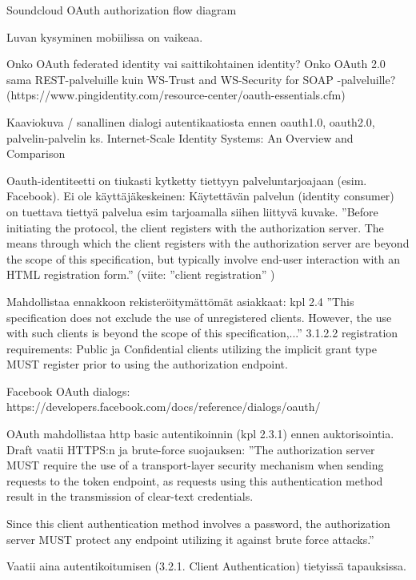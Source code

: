 \documentclass[finnish,gradu]{tktltiki}
\begin{document}
  Soundcloud OAuth authorization flow diagram %


  Luvan kysyminen mobiilissa on vaikeaa.

  Onko OAuth federated identity vai saittikohtainen identity?
  Onko OAuth 2.0 sama REST-palveluille kuin WS-Trust and WS-Security for SOAP -palveluille? (https://www.pingidentity.com/resource-center/oauth-essentials.cfm)

  Kaaviokuva / sanallinen dialogi autentikaatiosta ennen oauth1.0, oauth2.0, palvelin-palvelin
  ks. Internet-Scale Identity Systems: An Overview and Comparison

  Oauth-identiteetti on tiukasti kytketty tiettyyn palveluntarjoajaan (esim. Facebook).
  Ei ole käyttäjäkeskeinen: Käytettävän palvelun (identity consumer) on tuettava tiettyä palvelua esim tarjoamalla siihen liittyvä kuvake.
  ''Before initiating the protocol, the client registers with the authorization server. The means through which the client registers with the authorization
  server are beyond the scope of this specification, but typically involve end-user interaction with an HTML registration form.'' (viite: ''client registration'' \cite{ietf_oauth2})

  Mahdollistaa ennakkoon rekisteröitymättömät asiakkaat: kpl 2.4 ''This specification does not exclude the use of unregistered clients. However, the use with
  such clients is beyond the scope of this specification,...''
  3.1.2.2 registration requirements:
    Public ja Confidential clients utilizing the implicit grant type MUST register prior to using the authorization endpoint.


  Facebook OAuth dialogs: https://developers.facebook.com/docs/reference/dialogs/oauth/

  OAuth mahdollistaa http basic autentikoinnin (kpl 2.3.1) ennen auktorisointia.
  Draft vaatii HTTPS:n ja brute-force suojauksen:
    ''The authorization server MUST require the use of a transport-layer
     security mechanism when sending requests to the token endpoint, as
     requests using this authentication method result in the transmission
     of clear-text credentials.

     Since this client authentication method involves a password, the
     authorization server MUST protect any endpoint utilizing it against
     brute force attacks.''

  Vaatii aina autentikoitumisen (3.2.1. Client Authentication) tietyissä tapauksissa.
\end{document}
